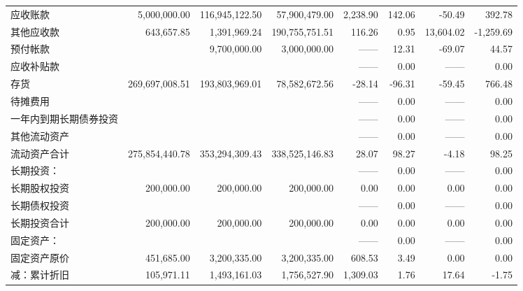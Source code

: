 \begin{longtable}{>{\scriptsize}p{8em}>{\scriptsize}r>{\scriptsize}r>{\scriptsize}r>{\scriptsize}r>{\scriptsize}r>{\scriptsize}r>{\scriptsize}r}
  应收账款	&	5,000,000.00	&	116,945,122.50	&	57,900,479.00	&	2,238.90	&	142.06	&	-50.49	&	392.78	\\
\hspace{2ex}其他应收款	&	643,657.85	&	1,391,969.24	&	190,755,751.51	&	116.26	&	0.95	&	13,604.02	&	-1,259.69	\\
\hspace{2ex}预付帐款	&		&	9,700,000.00	&	3,000,000.00	&	——	&	12.31	&	-69.07	&	44.57	\\
\hspace{2ex}应收补贴款	&		&		&		&	——	&	0.00	&	——	&	0.00	\\
\hspace{2ex}存货	&	269,697,008.51	&	193,803,969.01	&	78,582,672.56	&	-28.14	&	-96.31	&	-59.45	&	766.48	\\
\hspace{2ex}待摊费用	&		&		&		&	——	&	0.00	&	——	&	0.00	\\
\hspace{2ex}一年内到期长期债券投资	&		&		&		&	——	&	0.00	&	——	&	0.00	\\
\hspace{2ex}其他流动资产	&		&		&		&	——	&	0.00	&	——	&	0.00	\\
\hspace{2ex}\hspace{2ex}\hspace{2ex}   流动资产合计	&	275,854,440.78	&	353,294,309.43	&	338,525,146.83	&	28.07	&	98.27	&	-4.18	&	98.25	\\
\midrule
长期投资：	&		&		&		&	——	&	0.00	&	——	&	0.00	\\
\hspace{2ex}长期股权投资	&	200,000.00	&	200,000.00	&	200,000.00	&	0.00	&	0.00	&	0.00	&	0.00	\\
\hspace{2ex}长期债权投资	&		&		&		&	——	&	0.00	&	——	&	0.00	\\
\hspace{2ex}长期投资合计	&	200,000.00	&	200,000.00	&	200,000.00	&	0.00	&	0.00	&	0.00	&	0.00	\\
固定资产：	&		&		&		&	——	&	0.00	&	——	&	0.00	\\
\hspace{2ex}固定资产原价	&	451,685.00	&	3,200,335.00	&	3,200,335.00	&	608.53	&	3.49	&	0.00	&	0.00	\\
\hspace{2ex}\hspace{2ex}减：累计折旧	&	105,971.11	&	1,493,161.03	&	1,756,527.90	&	1,309.03	&	1.76	&	17.64	&	-1.75	\\

\end{longtable}
